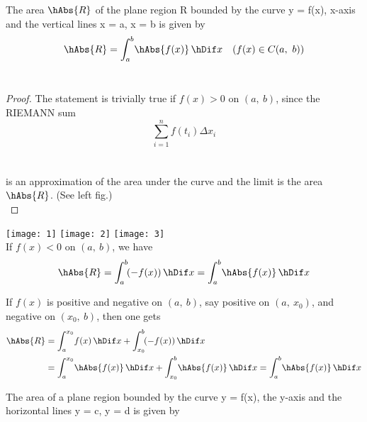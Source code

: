 \documentclass{amsbook}
\begin{document}

\begin{thm}
	The area $\hAbs{R}$ of the plane region R bounded by the curve y = f(x), x-axis and the vertical lines x = a, x = b 	is given by \\
	\begin{equation*}
		\hAbs{R} = \int_{a}^{b} \! \hAbs{f(x)} \, \hDif x \quad (f(x) \in C(a,\ b))
	\end{equation*} \\
\end{thm}

\begin{proof} 
	The statement is trivially true if $f(x) > 0$ on $(a,\ b)$, since the RIEMANN sum \\
	\begin{equation*}
		\sum_{i = 1}^{n} f(t_i) \Delta{x_i}
	\end{equation*} \\ \\
	is an approximation of the area under the curve and the limit is the area $\hAbs{R}$. (See left fig.) \\
\end{proof}

\noindent \texttt{[image: 1]} \texttt{[image: 2]} \texttt{[image: 3]} \\

If $f(x) < 0$ on $(a,\ b)$, we have
\begin{equation*}
	\hAbs{R} = \int_{a}^{b} \! (-f(x)) \, \hDif x = \int_{a}^{b} \! \hAbs{f(x)} \, \hDif x
\end{equation*}

If $f(x)$ is positive and negative on $(a,\ b)$, say positive on $(a,\ x_0)$, and negative on $(x_0,\ b)$, then one gets
\begin{align*}
	\hAbs{R} &= \int_{a}^{x_0} \! f(x) \, \hDif x + \int_{x_0}^{b} \! (-f(x)) \, \hDif x \\
	&= \int_{a}^{x_0} \! \hAbs{f(x)} \, \hDif x + \int_{x_0}^{b} \! \hAbs{f(x)} \, \hDif x = \int_{a}^{b} \! \hAbs{f(x)} \, \hDif x
\end{align*}

\begin{cor}
	The area of a plane region bounded by the curve y = f(x), the y-axis and the horizontal lines y = c, y = d is 		given by
\end{cor}

\thispagestyle{empty} 
\end{document}
